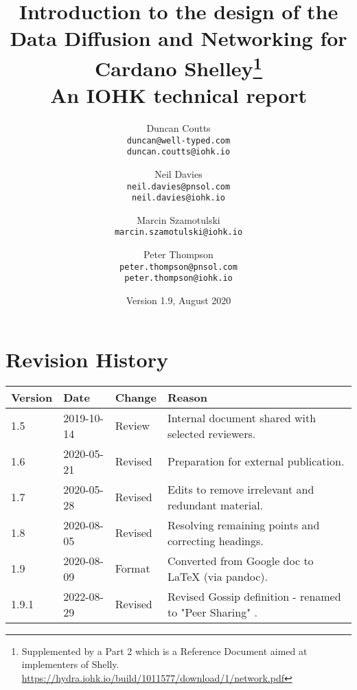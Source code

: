 \documentclass[11pt,a4paper]{article}
\begin{document}

\title{Introduction to the design of the
       Data Diffusion and Networking for
       Cardano Shelley\footnote{Supplemented by a Part 2 which is a
       Reference Document aimed at implementers of Shelly.
  \href{https://hydra.iohk.io/build/1011577/download/1/network.pdf}{{https://hydra.iohk.io/build/1011577/download/1/network.pdf}}} \\
       {\large \sc An IOHK technical report}
  }
\date{Version 1.9, August 2020}
\author{Duncan Coutts      \\ {\small \texttt{duncan@well-typed.com}} \\
                              {\small \texttt{duncan.coutts@iohk.io}}
   \and Neil Davies        \\ {\small \texttt{neil.davies@pnsol.com}} \\
                              {\small \texttt{neil.davies@iohk.io}}
   \and Marcin Szamotulski \\ {\small \texttt{marcin.szamotulski@iohk.io}}
   \and Peter Thompson     \\ {\small \texttt{peter.thompson@pnsol.com}} \\
                              {\small \texttt{peter.thompson@iohk.io}}
   }

\maketitle

\tableofcontents
\listoftables

\section{Revision History}
\label{revision-history}

\begin{longtable}[]{@{}llll@{}}
\toprule
\textbf{Version} & \textbf{Date} & \textbf{Change} &
\textbf{Reason}\tabularnewline
\midrule
\endhead
1.5 & 2019-10-14 & Review & Internal document shared with selected reviewers.\\
1.6 & 2020-05-21 & Revised & Preparation for external publication.\\
1.7 & 2020-05-28 & Revised & Edits to remove irrelevant and redundant
material.\\
1.8 & 2020-08-05 & Revised & Resolving remaining points and correcting
headings.\\
1.9 & 2020-08-09 & Format & Converted from Google doc to LaTeX (via pandoc).\\
1.9.1 & 2022-08-29 & Revised & Revised Gossip definition - renamed to "Peer Sharing" .\\
\bottomrule
\end{longtable}
\end{document}
